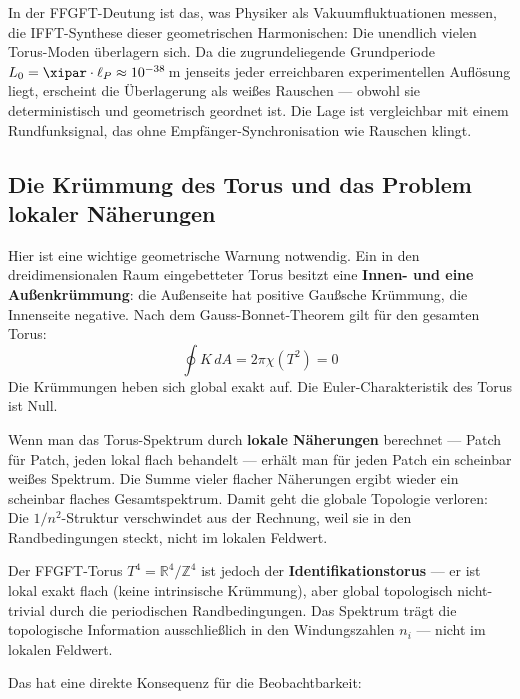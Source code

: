 \begin{interpretation}
In der FFGFT-Deutung ist das, was Physiker als Vakuumfluktuationen messen, die IFFT-Synthese dieser
geometrischen Harmonischen: Die unendlich vielen Torus-Moden überlagern sich.
Da die zugrundeliegende Grundperiode $L_0 = \xipar \cdot \ell_P \approx 10^{-38}$\,m
jenseits jeder erreichbaren experimentellen Auflösung liegt, erscheint die Überlagerung
als weißes Rauschen — obwohl sie deterministisch und geometrisch geordnet ist.
Die Lage ist vergleichbar mit einem
Rundfunksignal, das ohne Empfänger-Synchronisation wie Rauschen klingt.
\end{interpretation}

\subsection{Die Krümmung des Torus und das Problem lokaler Näherungen}

Hier ist eine wichtige geometrische Warnung notwendig. Ein in den dreidimensionalen
Raum eingebetteter Torus besitzt eine \textbf{Innen- und eine Außenkrümmung}:
die Außenseite hat positive Gaußsche Krümmung, die Innenseite negative. Nach dem
Gauss-Bonnet-Theorem gilt für den gesamten Torus:
\begin{equation}
    \oint K \, dA = 2\pi \chi(T^2) = 0
\end{equation}
Die Krümmungen heben sich global exakt auf. Die Euler-Charakteristik des Torus
ist Null.

\begin{important}
Wenn man das Torus-Spektrum durch \textbf{lokale Näherungen} berechnet —
Patch für Patch, jeden lokal flach behandelt — erhält man für jeden Patch
ein scheinbar weißes Spektrum. Die Summe vieler flacher Näherungen ergibt
wieder ein scheinbar flaches Gesamtspektrum. Damit geht die globale Topologie
verloren: Die $1/n^2$-Struktur verschwindet aus der Rechnung, weil sie in den
Randbedingungen steckt, nicht im lokalen Feldwert.
\end{important}

Der FFGFT-Torus $T^4 = \mathbb{R}^4/\mathbb{Z}^4$ ist jedoch der
\textbf{Identifikationstorus} — er ist lokal exakt flach (keine intrinsische
Krümmung), aber global topologisch nicht-trivial durch die periodischen
Randbedingungen. Das Spektrum trägt die topologische Information
ausschließlich in den Windungszahlen $n_i$ — nicht im lokalen Feldwert.

Das hat eine direkte Konsequenz für die Beobachtbarkeit:

